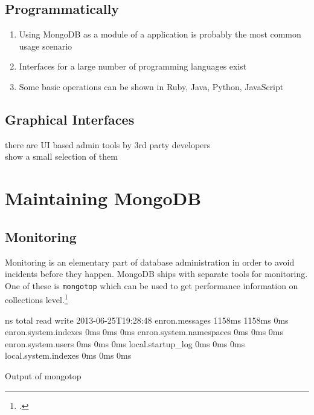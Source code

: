 \FloatBarrier

\subsection{Programmatically}
\label{sec:usage-programmatically}
\begin{enumerate}
  \item Using MongoDB as a module of a application is probably the most common usage scenario
  \item Interfaces for a large number of programming languages exist
  \item Some basic operations can be shown in Ruby, Java, Python, JavaScript
\end{enumerate}


\subsection{Graphical Interfaces}
\label{sec:usage-gui}
there are UI based admin tools by 3rd party developers\\
show a small selection of them

\newpage
\section{Maintaining MongoDB}
\label{sec:maintenance}

\subsection{Monitoring}
\label{sec:maintenance-monitroing}
Monitoring is an elementary part of database administration in order to avoid
incidents before they happen. MongoDB ships with separate tools for monitoring.
One of these is \texttt{mongotop} which can be used to get performance information
on collections level.\footcite[Cf.][]{mongo_monitoring}
\begin{listing}
    \begin{bashcode}
                            ns       total        read       write
2013-06-25T19:28:48
                enron.messages      1158ms      1158ms         0ms
          enron.system.indexes         0ms         0ms         0ms
       enron.system.namespaces         0ms         0ms         0ms
            enron.system.users         0ms         0ms         0ms
             local.startup_log         0ms         0ms         0ms
          local.system.indexes         0ms         0ms         0ms
    \end{bashcode}
    \caption{Output of mongotop}
    \label{lst:mongotop}
\end{listing}

